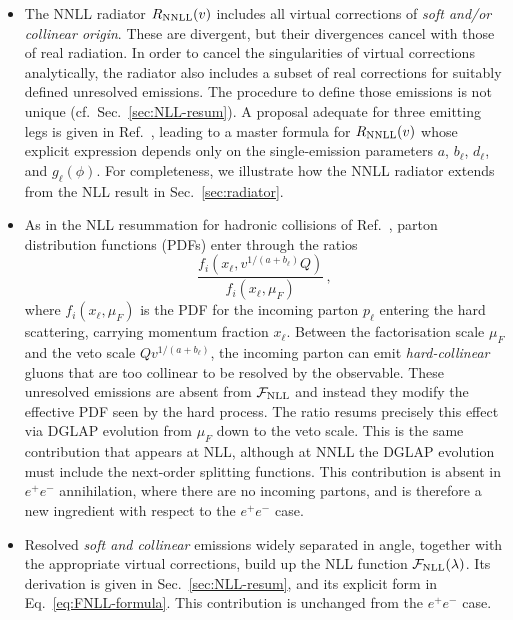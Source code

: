\begin{itemize}  
\item The NNLL radiator $R_{\rm NNLL}(v)$ includes all virtual
  corrections of \emph{soft and/or collinear origin}. These are divergent,
  but their divergences cancel with those of real radiation. In
  order to cancel the singularities of virtual corrections analytically, the
  radiator also includes a subset of real corrections for suitably
  defined unresolved emissions. The procedure to define those
  emissions is not unique (cf.\ Sec.~\ref{sec:NLL-resum}). 
  A proposal adequate for three emitting legs is given in
  Ref.~\cite{Arpino:2019ozn}, leading to a master formula for
  $R_{\rm NNLL}(v)$ whose explicit expression depends only on the
  single-emission parameters $a$, $b_\ell$, $d_\ell$, and
  $g_\ell(\phi)$. For completeness, we illustrate how
  the NNLL radiator extends from the NLL result in
  Sec.~\ref{sec:radiator}. 
  
 \item As in the NLL resummation for hadronic collisions of
Ref.~\cite{Banfi:2004yd}, parton distribution functions (PDFs) enter through the ratios
\begin{equation*}
\frac{f_i(x_\ell,v^{1/(a+b_\ell)}Q)}{f_i(x_\ell,\mu_F)}\,,
\end{equation*}
where $f_i(x_\ell,\mu_F)$
is the PDF for the incoming parton $p_\ell$ entering the hard scattering, carrying momentum fraction
$x_\ell$. Between the factorisation scale $\mu_F$ and the veto scale
 $Qv^{1/(a+b_\ell)}$, the incoming parton can emit \emph{hard-collinear}
  gluons that are too collinear to be resolved by the observable.
  These unresolved emissions are absent from
  $\mathcal{F}_{\rm NLL}$ and instead they modify the effective PDF seen
  by the hard process. The ratio resums precisely this effect via DGLAP
  evolution from $\mu_F$ down to the veto scale. This is the same
contribution that appears at NLL, although at NNLL the DGLAP evolution must
include the next-order splitting functions. This contribution is absent in
 $e^+e^-$ annihilation, where there are no incoming partons, and
is therefore a new ingredient with respect to the $e^+e^-$ case.

\item Resolved \emph{soft and collinear} emissions widely separated in angle,
  together with the appropriate virtual corrections, build up the
  NLL function $\mathcal{F}_{\rm NLL}(\lambda)$.
  Its derivation is given in Sec.~\ref{sec:NLL-resum}, and its explicit form in
  Eq.~\eqref{eq:FNLL-formula}. This contribution is unchanged from the
  $e^+e^-$ case. 
  

\end{itemize}
